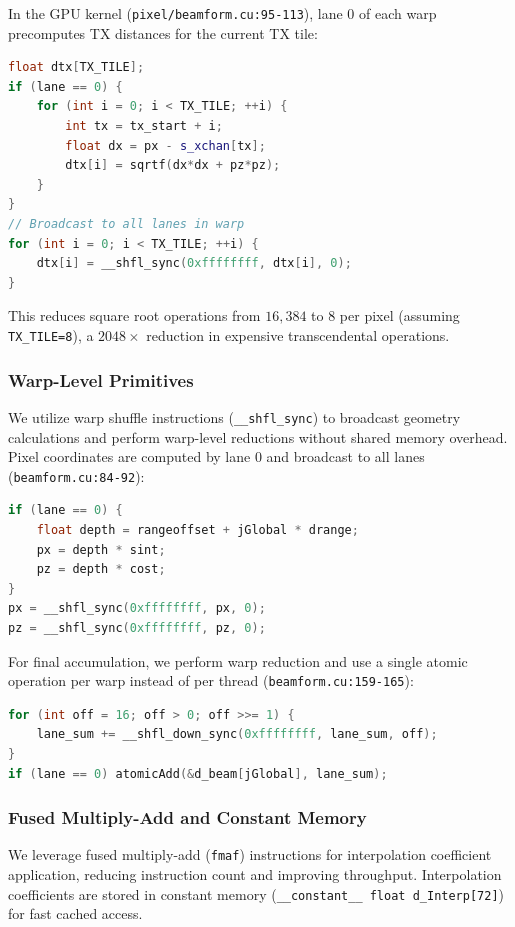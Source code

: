 \documentclass{article}
\begin{document}
In the GPU kernel (\texttt{pixel/beamform.cu:95-113}), lane 0 of each warp precomputes TX distances for the current TX tile:

\begin{lstlisting}[language=C++]
float dtx[TX_TILE];
if (lane == 0) {
    for (int i = 0; i < TX_TILE; ++i) {
        int tx = tx_start + i;
        float dx = px - s_xchan[tx];
        dtx[i] = sqrtf(dx*dx + pz*pz);
    }
}
// Broadcast to all lanes in warp
for (int i = 0; i < TX_TILE; ++i) {
    dtx[i] = __shfl_sync(0xffffffff, dtx[i], 0);
}
\end{lstlisting}

This reduces square root operations from $16,384$ to $8$ per pixel (assuming \texttt{TX\_TILE=8}), a $2048\times$ reduction in expensive transcendental operations.

\subsubsection{Warp-Level Primitives}

We utilize warp shuffle instructions (\texttt{\_\_shfl\_sync}) to broadcast geometry calculations and perform warp-level reductions without shared memory overhead. Pixel coordinates are computed by lane 0 and broadcast to all lanes (\texttt{beamform.cu:84-92}):

\begin{lstlisting}[language=C++]
if (lane == 0) {
    float depth = rangeoffset + jGlobal * drange;
    px = depth * sint;
    pz = depth * cost;
}
px = __shfl_sync(0xffffffff, px, 0);
pz = __shfl_sync(0xffffffff, pz, 0);
\end{lstlisting}

For final accumulation, we perform warp reduction and use a single atomic operation per warp instead of per thread (\texttt{beamform.cu:159-165}):

\begin{lstlisting}[language=C++]
for (int off = 16; off > 0; off >>= 1) {
    lane_sum += __shfl_down_sync(0xffffffff, lane_sum, off);
}
if (lane == 0) atomicAdd(&d_beam[jGlobal], lane_sum);
\end{lstlisting}

\subsubsection{Fused Multiply-Add and Constant Memory}

We leverage fused multiply-add (\texttt{fmaf}) instructions for interpolation coefficient application, reducing instruction count and improving throughput. Interpolation coefficients are stored in constant memory (\texttt{\_\_constant\_\_ float d\_Interp[72]}) for fast cached access.
\end{document}
